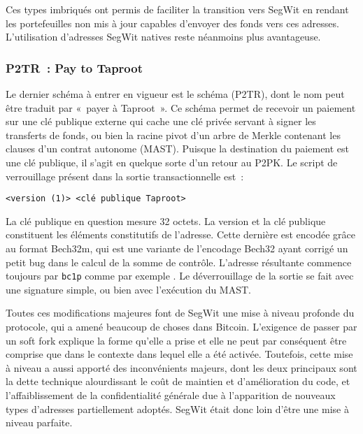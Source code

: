 Ces types imbriqués ont permis de faciliter la transition vers SegWit en rendant les portefeuilles non mis à jour capables d'envoyer des fonds vers ces adresses. L'utilisation d'adresses SegWit natives reste néanmoins plus avantageuse.

\subsubsection*{P2TR~: Pay to Taproot} Le dernier schéma à entrer en vigueur est le schéma  (P2TR), dont le nom peut être traduit par «~payer à Taproot~». Ce schéma permet de recevoir un paiement sur une clé publique externe qui cache une clé privée servant à signer les transferts de fonds, ou bien la racine pivot d'un arbre de Merkle contenant les clauses d'un contrat autonome (MAST). Puisque la destination du paiement est une clé publique, il s'agit en quelque sorte d'un retour au P2PK. Le script de verrouillage présent dans la sortie transactionnelle est~:

\begin{Verbatim}[fontsize=\footnotesize]
<version (1)> <clé publique Taproot>
\end{Verbatim}

La clé publique en question mesure 32 octets. La version et la clé publique constituent les éléments constitutifs de l'adresse. Cette dernière est encodée grâce au format Bech32m, qui est une variante de l'encodage Bech32 ayant corrigé un petit bug dans le calcul de la somme de contrôle. L'adresse résultante commence toujours par \texttt{bc1p} comme par exemple . Le déverrouillage de la sortie se fait avec une signature simple, ou bien avec l'exécution du MAST.



Toutes ces modifications majeures font de SegWit une mise à niveau profonde du protocole, qui a amené beaucoup de choses dans Bitcoin. L'exigence de passer par un soft fork explique la forme qu'elle a prise et elle ne peut par conséquent être comprise que dans le contexte dans lequel elle a été activée. Toutefois, cette mise à niveau a aussi apporté des inconvénients majeurs, dont les deux principaux sont la dette technique alourdissant le coût de maintien et d'amélioration du code, et l'affaiblissement de la confidentialité générale due à l'apparition de nouveaux types d'adresses partiellement adoptés. SegWit était donc loin d'être une mise à niveau parfaite.

